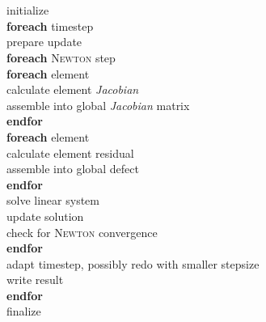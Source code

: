 \clearpage
\begin{tabbing}
\textbf{} 			\hspace{0.01\textwidth} \=
\textbf{} 			\hspace{0.01\textwidth} \=
\textbf{} 	\hspace{0.01\textwidth}	\= 
\textbf{} 			\hspace{0.01\textwidth} \\
\\
initialize \\
\textbf{foreach} timestep\\

\> prepare update\\
\> \textbf{foreach} \textsc{Newton} step \\

\> \> \textbf{foreach} element \\

\> \> \> calculate element \textit{Jacobian}\\ 
\> \> \> assemble into global \textit{Jacobian} matrix \\

\> \> \textbf{endfor} \\

\> \>  \textbf{foreach} element  \\
\> \> \> calculate element residual \\
\> \> \> assemble into global defect\\
\> \>  \textbf{endfor} \\

\> \> solve linear system\\
\> \> update solution\\
\> \> check for \textsc{Newton} convergence\\
\> \textbf{endfor}\\
\> adapt timestep, possibly redo with smaller stepsize\\
\> write result\\
\textbf{endfor}\\
finalize\\
\end{tabbing}


